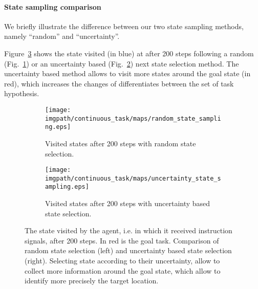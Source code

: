 \paragraph{State sampling comparison}

We briefly illustrate the difference between our two state sampling methods, namely ``random'' and ``uncertainty''.

Figure~\ref{fig:continuoustaskstatesampling} shows the state visited (in blue) at after 200 steps  following a random (Fig.~\ref{fig:continuousstaterandomstates}) or an uncertainty based (Fig.~\ref{fig:continuousstateuncertaintystates}) next state selection method. The uncertainty based method allows to visit more states around the goal state (in red), which increases the changes of differentiates between the set of task hypothesis.

\begin{figure}[!htbp]
\centering
    \begin{subfigure}[t]{0.49\columnwidth}
        \centering
        \texttt{[image: \\imgpath/continuous\_task/maps/random\_state\_sampling.eps]}
        \caption{Visited states after 200 steps with random state selection.}
        \label{fig:continuousstaterandomstates}
    \end{subfigure}
    \begin{subfigure}[t]{0.49\columnwidth}
        \centering
        \texttt{[image: \\imgpath/continuous\_task/maps/uncertainty\_state\_sampling.eps]}
        \caption{Visited states after 200 steps with uncertainty based state selection.}
        \label{fig:continuousstateuncertaintystates}
    \end{subfigure}
\caption{The state visited by the agent, i.e. in which it received instruction signals, after 200 steps. In red is the goal task. Comparison of random state selection (left) and uncertainty based state selection (right). Selecting state according to their uncertainty, allow to collect more information around the goal state, which allow to identify more precisely the target location.}
\label{fig:continuoustaskstatesampling}
\end{figure}

